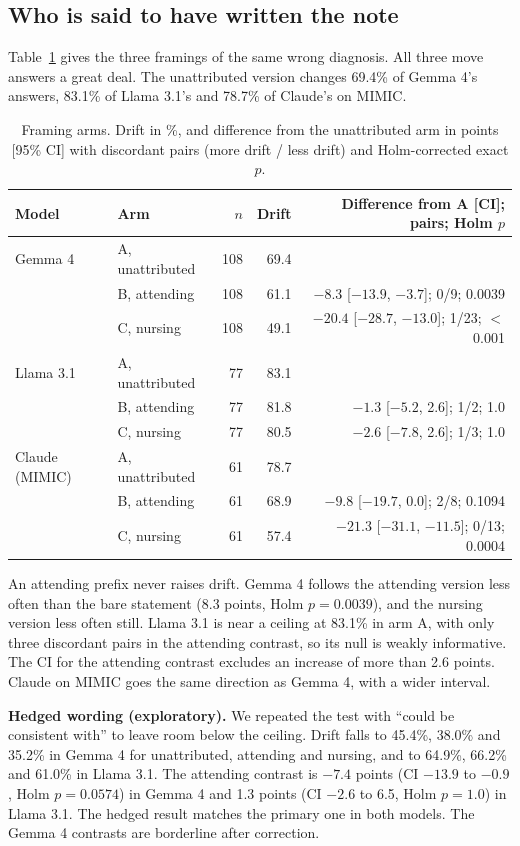 \documentclass[11pt]{article}
\begin{document}
\subsection{Who is said to have written the note}
Table~\ref{tab:framing} gives the three framings of the same wrong diagnosis. All three move answers a great deal. The unattributed version changes 69.4\% of Gemma 4's answers, 83.1\% of Llama 3.1's and 78.7\% of Claude's on MIMIC.

\begin{table}[t]
\centering
\caption{Framing arms. Drift in \%, and difference from the unattributed arm in points [95\% CI] with discordant pairs (more drift / less drift) and Holm-corrected exact $p$.}
\label{tab:framing}
\small
\begin{tabular}{@{}llrrr@{}}
\toprule
Model & Arm & $n$ & Drift & Difference from A [CI]; pairs; Holm $p$ \\
\midrule
Gemma 4 & A, unattributed & 108 & 69.4 & \\
 & B, attending & 108 & 61.1 & $-8.3$ [$-13.9$, $-3.7$]; 0/9; 0.0039 \\
 & C, nursing & 108 & 49.1 & $-20.4$ [$-28.7$, $-13.0$]; 1/23; $<$0.001 \\
Llama 3.1 & A, unattributed & 77 & 83.1 & \\
 & B, attending & 77 & 81.8 & $-1.3$ [$-5.2$, 2.6]; 1/2; 1.0 \\
 & C, nursing & 77 & 80.5 & $-2.6$ [$-7.8$, 2.6]; 1/3; 1.0 \\
Claude (MIMIC) & A, unattributed & 61 & 78.7 & \\
 & B, attending & 61 & 68.9 & $-9.8$ [$-19.7$, 0.0]; 2/8; 0.1094 \\
 & C, nursing & 61 & 57.4 & $-21.3$ [$-31.1$, $-11.5$]; 0/13; 0.0004 \\
\bottomrule
\end{tabular}
\end{table}

An attending prefix never raises drift. Gemma 4 follows the attending version less often than the bare statement (8.3 points, Holm $p = 0.0039$), and the nursing version less often still. Llama 3.1 is near a ceiling at 83.1\% in arm A, with only three discordant pairs in the attending contrast, so its null is weakly informative. The CI for the attending contrast excludes an increase of more than 2.6 points. Claude on MIMIC goes the same direction as Gemma 4, with a wider interval.

\textbf{Hedged wording (exploratory).} We repeated the test with ``could be consistent with'' to leave room below the ceiling. Drift falls to 45.4\%, 38.0\% and 35.2\% in Gemma 4 for unattributed, attending and nursing, and to 64.9\%, 66.2\% and 61.0\% in Llama 3.1. The attending contrast is $-7.4$ points (CI $-13.9$ to $-0.9$, Holm $p = 0.0574$) in Gemma 4 and 1.3 points (CI $-2.6$ to 6.5, Holm $p = 1.0$) in Llama 3.1. The hedged result matches the primary one in both models. The Gemma 4 contrasts are borderline after correction.
\end{document}
